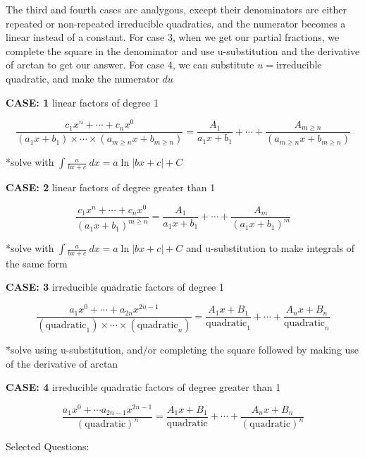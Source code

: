 \documentclass{article}
\begin{document}
The third and fourth cases are analygous, except their denominators are either repeated or non-repeated irreducible quadratics, and the numerator becomes a linear instead of a constant. For case 3, when we get our partial fractions, we complete the square in the denominator and use u-substitution and the derivative of arctan to get our answer. For case 4, we can substitute $u=$irreducible quadratic, and make the numerator $du$

\vspace{10pt}

{\bf{}CASE: 1} linear factors of degree 1

\[\frac{c_1x^n+\cdots+c_nx^0}{(a_1x+b_1)\times\cdots\times(a_{m\geq n}x+b_{m\geq n})}=\frac{A_1}{a_1x+b_1}+\cdots+\frac{A_{m\geq n}}{(a_{m\geq n}x+b_{m\geq n})}\]

*solve with $\int\frac{a}{bx+c}\ dx=a\ln|bx+c|+C$

\vspace{10pt}

{\bf{}CASE: 2} linear factors of degree greater than 1

\[\frac{c_1x^n+\cdots+c_nx^0}{(a_1x+b_1)^{m\geq n}}=\frac{A_1}{a_1x+b_1}+\cdots+\frac{A_m}{(a_1x+b_1)^m}\]

*solve with $\int\frac{a}{bx+c}\ dx=a\ln|bx+c|+C$ and u-substitution to make integrals of the same form

{\bf{}CASE: 3} irreducible quadratic factors of degree 1

\[\frac{a_1x^0+\cdots+a_{2n}x^{2n-1}}{(\mbox{quadratic}_1)\times\cdots\times(\mbox{quadratic}_n)}=\frac{A_1x+B_1}{\mbox{quadratic}_1}+\cdots+\frac{A_nx+B_n}{\mbox{quadratic}_n}\]

*solve using u-substitution, and/or completing the square followed by making use of the derivative of arctan

\vspace{10pt}

{\bf{}CASE: 4} irreducible quadratic factors of degree greater than 1

\[\frac{a_1x^0+\cdots a_{2n-1}x^{2n-1}}{(\mbox{quadratic})^n}=\frac{A_1x+B_1}{\mbox{quadratic}}+\cdots+\frac{A_nx+B_n}{(\mbox{quadratic})^n}\]

\vspace{10pt}

Selected Questions:
\end{document}
